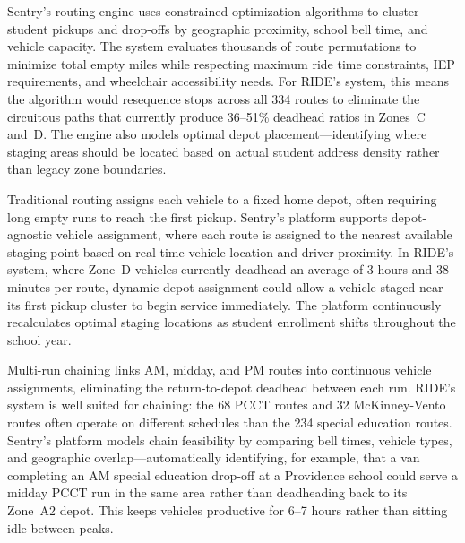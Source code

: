 \begin{description}[style=nextline, leftmargin=0.5cm]
    \item[\faIcon{route} \textbf{Algorithm-Based Route Optimization:}] Sentry's routing engine uses constrained optimization algorithms to cluster student pickups and drop-offs by geographic proximity, school bell time, and vehicle capacity. The system evaluates thousands of route permutations to minimize total empty miles while respecting maximum ride time constraints, IEP requirements, and wheelchair accessibility needs. For RIDE's system, this means the algorithm would resequence stops across all 334 routes to eliminate the circuitous paths that currently produce 36--51\% deadhead ratios in Zones~C and~D. The engine also models optimal depot placement---identifying where staging areas should be located based on actual student address density rather than legacy zone boundaries.

    \item[\faIcon{map-marked-alt} \textbf{Dynamic Depot Assignment:}] Traditional routing assigns each vehicle to a fixed home depot, often requiring long empty runs to reach the first pickup. Sentry's platform supports depot-agnostic vehicle assignment, where each route is assigned to the nearest available staging point based on real-time vehicle location and driver proximity. In RIDE's system, where Zone~D vehicles currently deadhead an average of 3 hours and 38 minutes per route, dynamic depot assignment could allow a vehicle staged near its first pickup cluster to begin service immediately. The platform continuously recalculates optimal staging locations as student enrollment shifts throughout the school year.

    \item[\faIcon{exchange-alt} \textbf{Multi-Run Chaining:}] Multi-run chaining links AM, midday, and PM routes into continuous vehicle assignments, eliminating the return-to-depot deadhead between each run. RIDE's system is well suited for chaining: the 68 PCCT routes and 32 McKinney-Vento routes often operate on different schedules than the 234 special education routes. Sentry's platform models chain feasibility by comparing bell times, vehicle types, and geographic overlap---automatically identifying, for example, that a van completing an AM special education drop-off at a Providence school could serve a midday PCCT run in the same area rather than deadheading back to its Zone~A2 depot. This keeps vehicles productive for 6--7 hours rather than sitting idle between peaks.


\end{description}
